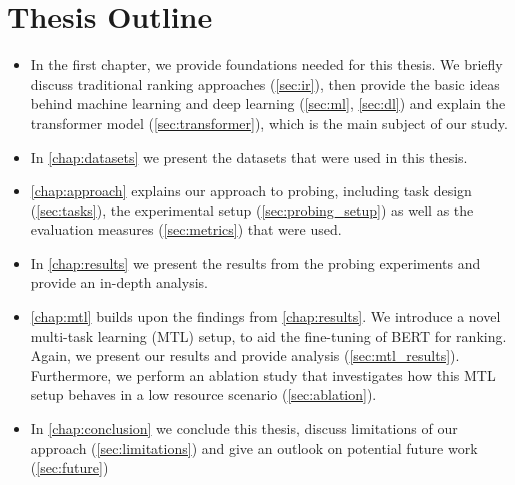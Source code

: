 \section{Thesis Outline}
\begin{itemize}
    \item In the first chapter, we provide foundations needed for this thesis. We briefly discuss traditional ranking approaches (\autoref{sec:ir}), then provide the basic ideas behind machine learning and deep learning (\autoref{sec:ml}, \autoref{sec:dl}) and explain the transformer model (\autoref{sec:transformer}), which is the main subject of our study.
    \item In \autoref{chap:datasets} we present the datasets that were used in this thesis.
    \item \autoref{chap:approach} explains our approach to probing, including task design (\autoref{sec:tasks}), the experimental setup (\autoref{sec:probing_setup}) as well as the evaluation measures (\autoref{sec:metrics}) that were used.
    \item In \autoref{chap:results} we present the results from the probing experiments and provide an in-depth analysis.
    \item \autoref{chap:mtl} builds upon the findings from \autoref{chap:results}. We introduce a novel multi-task learning (MTL) setup, to aid the fine-tuning of BERT for ranking. Again, we present our results and provide analysis (\autoref{sec:mtl_results}). Furthermore, we perform an ablation study that investigates how this MTL setup behaves in a low resource scenario (\autoref{sec:ablation}).
    \item In \autoref{chap:conclusion} we conclude this thesis, discuss limitations of our approach (\autoref{sec:limitations}) and give an outlook on potential future work (\autoref{sec:future})
\end{itemize}
